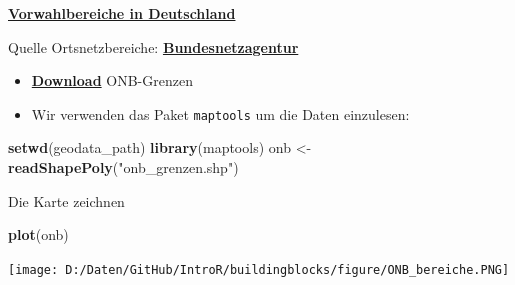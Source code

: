 \documentclass[ignorenonframetext,]{beamer}
\newenvironment{Shaded}{\begin{snugshade}}{\end{snugshade}}
\newcommand{\KeywordTok}[1]{\textcolor[rgb]{0.26,0.66,0.93}{\textbf{#1}}}
\newcommand{\StringTok}[1]{\textcolor[rgb]{0.02,0.61,0.04}{#1}}
\newcommand{\NormalTok}[1]{\textcolor[rgb]{0.74,0.68,0.62}{#1}}
\begin{document}
\begin{frame}[fragile]{\href{http://www.bundesnetzagentur.de/SharedDocs/Downloads/DE/Sachgebiete/Telekommunikation/Unternehmen_Institutionen/Nummerierung/Rufnummern/ONVerzeichnisse/ONBGrenzen/ONB_Grenzen.html}{\textbf{Vorwahlbereiche
in Deutschland}}}

\begin{block}{Quelle Ortsnetzbereiche:
\href{https://www.bundesnetzagentur.de/DE/Sachgebiete/Telekommunikation/Unternehmen_Institutionen/Nummerierung/Rufnummern/ONRufnr/ON_Einteilung_ONB/ON_ONB_ONKz_ONBGrenzen_Basepage.html}{\textbf{Bundesnetzagentur}}}

\begin{itemize}
\item
  \href{https://www.bundesnetzagentur.de/SharedDocs/Downloads/DE/Sachgebiete/Telekommunikation/Unternehmen_Institutionen/Nummerierung/Rufnummern/ONVerzeichnisse/ONBGrenzen/ONB-Grenzen-2018.zip?__blob=publicationFile\&v=21}{\textbf{Download}}
  ONB-Grenzen
\item
  Wir verwenden das Paket \texttt{maptools} um die Daten einzulesen:
\end{itemize}

\begin{Shaded}
\begin{Highlighting}[]
\KeywordTok{setwd}\NormalTok{(geodata_path)}
\KeywordTok{library}\NormalTok{(maptools)}
\NormalTok{onb <-}\StringTok{ }\KeywordTok{readShapePoly}\NormalTok{(}\StringTok{"onb_grenzen.shp"}\NormalTok{)}
\end{Highlighting}
\end{Shaded}

\end{block}

\end{frame}

\begin{frame}[fragile]{Die Karte zeichnen}

\begin{Shaded}
\begin{Highlighting}[]
\KeywordTok{plot}\NormalTok{(onb)}
\end{Highlighting}
\end{Shaded}

\texttt{[image: D:/Daten/GitHub/IntroR/buildingblocks/figure/ONB\_bereiche.PNG]}

\end{frame}
\end{document}
